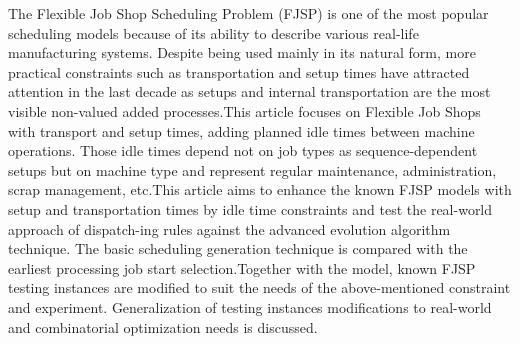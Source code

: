 
\begin{Abstrakt}
    The Flexible Job Shop Scheduling Problem (FJSP) is one of the most popular scheduling models because of its ability to describe various real-life manufacturing systems. Despite being used mainly in its natural form, more practical constraints such as transportation and setup times have attracted attention in the last decade as setups and internal transportation are the most visible non-valued added processes.\newline This article focuses on Flexible Job Shops with transport and setup times, adding planned idle times between machine operations. Those idle times depend not on job types as sequence-dependent setups but on machine type and represent regular maintenance, administration, scrap management, etc.\newline This article aims to enhance the known FJSP models with setup and transportation times by idle time constraints and test the real-world approach of dispatch-ing rules against the advanced evolution algorithm technique. The basic scheduling generation technique is compared with the earliest processing job start selection.\newline Together with the model, known FJSP testing instances are modified to suit the needs of the above-mentioned constraint and experiment. Generalization of testing instances modifications to real-world and combinatorial optimization needs is discussed.
\end{Abstrakt}



\clearpage